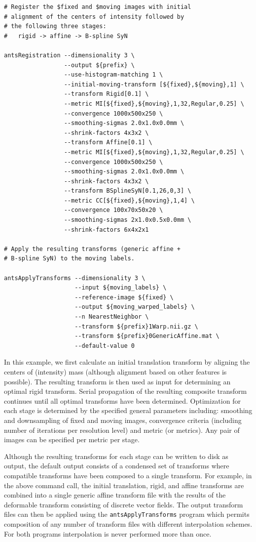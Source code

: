 \documentclass{frontiersSCNS}
\begin{document}
\begin{lstlisting}
# Register the $fixed and $moving images with initial
# alignment of the centers of intensity followed by 
# the following three stages:
#   rigid -> affine -> B-spline SyN

antsRegistration --dimensionality 3 \
                 --output ${prefix} \
                 --use-histogram-matching 1 \
                 --initial-moving-transform [${fixed},${moving},1] \
                 --transform Rigid[0.1] \
                 --metric MI[${fixed},${moving},1,32,Regular,0.25] \ 
                 --convergence 1000x500x250 \
                 --smoothing-sigmas 2.0x1.0x0.0mm \
                 --shrink-factors 4x3x2 \
                 --transform Affine[0.1] \
                 --metric MI[${fixed},${moving},1,32,Regular,0.25] \ 
                 --convergence 1000x500x250 \
                 --smoothing-sigmas 2.0x1.0x0.0mm \
                 --shrink-factors 4x3x2 \
                 --transform BSplineSyN[0.1,26,0,3] \
                 --metric CC[${fixed},${moving},1,4] \ 
                 --convergence 100x70x50x20 \
                 --smoothing-sigmas 2x1.0x0.5x0.0mm \
                 --shrink-factors 6x4x2x1

# Apply the resulting transforms (generic affine + 
# B-spline SyN) to the moving labels.
                   
antsApplyTransforms --dimensionality 3 \
                    --input ${moving_labels} \
                    --reference-image ${fixed} \
                    --output ${moving_warped_labels} \
                    --n NearestNeighbor \
                    --transform ${prefix}1Warp.nii.gz \
                    --transform ${prefix}0GenericAffine.mat \
                    --default-value 0
\end{lstlisting}
In this example, we first calculate an initial translation transform by aligning
the centers of (intensity) mass (although alignment based on other features is possible). 
The resulting transform is then used as input 
for determining an optimal rigid transform.  Serial propagation of the resulting
composite transform continues until all optimal transforms have been determined.
Optimization for each stage is determined by the specified general parameters 
including: smoothing and downsampling of fixed and moving images, convergence
criteria (including number of iterations per resolution level) and metric (or
metrics).  Any pair of images can be specified per metric per stage.  

Although the
resulting transforms for each stage can be written to disk as output, the 
default output consists of a condensed set of transforms where compatible 
transforms have been composed to a single transform.  For example, in the
above command call, the initial translation, rigid, and affine transforms are
combined into a single generic affine transform file with the results of the
deformable transform consisting of discrete vector fields.  The output
transform files can then be applied using the {\tt antsApplyTransforms}
program which permits composition of any number of transform files with 
different interpolation schemes.   For both programs interpolation is never
performed more than once. 
\end{document}
